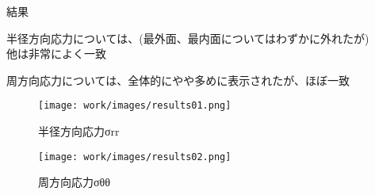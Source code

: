 \begin{frame}{結果}
 
  半径方向応力については、(最外面、最内面についてはわずかに外れたが) \\
  他は非常によく一致

  周方向応力については、全体的にやや多めに表示されたが、ほぼ一致　
\begin{figure}[htbp]
\centering
  \begin{minipage}{0.49\columnwidth}
     \centering
     \texttt{[image: work/images/results01.png]}
     \caption{半径方向応力σrr}
     \label{fig:hidari}
  \end{minipage}
%
  \begin{minipage}{0.49\columnwidth}
     \centering
     \texttt{[image: work/images/results02.png]}
     \caption{周方向応力σθθ}
     \label{fig:migi}
  \end{minipage}
\end{figure}

\end{frame}
